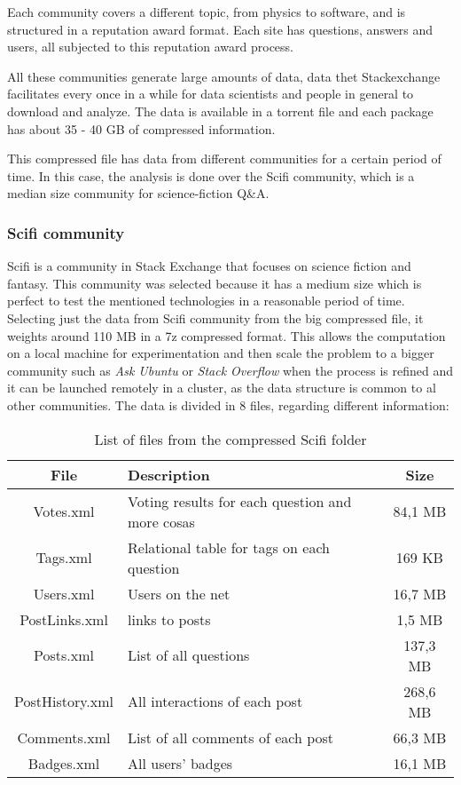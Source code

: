 \documentclass[11pt]{article} %
\begin{document}
    Each community covers a different topic, from physics to software, and is structured in a reputation award format. Each site has questions, answers and users, all subjected to this reputation award process.

    All these communities generate large amounts of data, data thet Stackexchange facilitates every once in a while for data scientists and people in general to download and analyze. The data is available in a torrent file and each package has about 35 - 40 GB of compressed information.

    This compressed file has data from different communities for a certain period of time. In this case, the analysis is done over the Scifi community, which is a median size community for science-fiction Q\&A.

    \subsubsection{Scifi community}

    Scifi is a community in Stack Exchange that focuses on science fiction and fantasy. This community was selected because it has a medium size which is perfect to test the mentioned technologies in a reasonable period of time. Selecting just the data from Scifi community from the big compressed file, it weights around 110 MB in a 7z compressed format. This allows the computation on a local machine for experimentation and then scale the problem to a bigger community such as \emph{Ask Ubuntu} or \emph{Stack Overflow} when the process is refined and it can be launched remotely in a cluster, as the data structure is common to al other communities. The data is divided in 8 files, regarding different information:

    \begin{table}[!h]
      \centering
      \begin{tabular}{|c|p{}|c|}
        \hline

        File & Description & Size \\ \hline
        Votes.xml & Voting results for each question and more cosas & 84,1 MB \\ \hline
        Tags.xml & Relational table for tags on each question & 169 KB \\ \hline
        Users.xml & Users on the net & 16,7 MB \\ \hline
        PostLinks.xml & links to posts & 1,5 MB \\ \hline
        Posts.xml & List of all questions & 137,3 MB \\ \hline
        PostHistory.xml & All interactions of each post & 268,6 MB \\ \hline
        Comments.xml & List of all comments of each post & 66,3 MB \\ \hline
        Badges.xml & All users' badges & 16,1 MB \\

        \hline
      \end{tabular}
      \caption{List of files from the compressed Scifi folder}
      \label{tab:list_of_files}
    \end{table}
\end{document}

